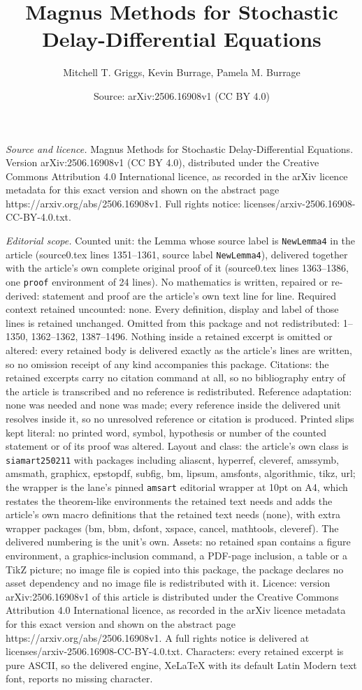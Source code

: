\documentclass[10pt,a4paper]{amsart}
\title[Magnus Methods for Stochastic Delay-Differential Equations]{Magnus Methods for Stochastic Delay-Differential Equations}
\author{Mitchell T. Griggs, Kevin Burrage, Pamela M. Burrage}
\date{Source: arXiv:2506.16908v1 (CC BY 4.0)}
\begin{document}
\maketitle

\noindent\emph{Source and licence.} Magnus Methods for Stochastic Delay-Differential Equations. Version arXiv:2506.16908v1 (CC BY 4.0), distributed under the Creative Commons Attribution 4.0 International licence, as recorded in the arXiv licence metadata for this exact version and shown on the abstract page https://arxiv.org/abs/2506.16908v1. Full rights notice: licenses/arxiv-2506.16908-CC-BY-4.0.txt.\par\smallskip

\noindent\textit{Editorial scope.} Counted unit: the Lemma whose source label is \texttt{NewLemma4} in the article (source0.tex lines 1351--1361, source label \texttt{NewLemma4}), delivered together with the article's own complete original proof of it (source0.tex lines 1363--1386, one \texttt{proof} environment of 24 lines). No mathematics is written, repaired or re-derived: statement and proof are the article's own text line for line. Required context retained uncounted: none. Every definition, display and label of those lines is retained unchanged. Omitted from this package and not redistributed: 1--1350, 1362--1362, 1387--1496. Nothing inside a retained excerpt is omitted or altered: every retained body is delivered exactly as the article's lines are written, so no omission receipt of any kind accompanies this package. Citations: the retained excerpts carry no citation command at all, so no bibliography entry of the article is transcribed and no reference is redistributed. Reference adaptation: none was needed and none was made; every reference inside the delivered unit resolves inside it, so no unresolved reference or citation is produced. Printed slips kept literal: no printed word, symbol, hypothesis or number of the counted statement or of its proof was altered. Layout and class: the article's own class is \texttt{siamart250211} with packages including aliascnt, hyperref, cleveref, amssymb, amsmath, graphicx, epstopdf, subfig, bm, lipsum, amsfonts, algorithmic, tikz, url; the wrapper is the lane's pinned \texttt{amsart} editorial wrapper at 10pt on A4, which restates the theorem-like environments the retained text needs and adds the article's own macro definitions that the retained text needs (none), with extra wrapper packages (bm, bbm, dsfont, xspace, cancel, mathtools, cleveref). The delivered numbering is the unit's own. Assets: no retained span contains a figure environment, a graphics-inclusion command, a PDF-page inclusion, a table or a TikZ picture; no image file is copied into this package, the package declares no asset dependency and no image file is redistributed with it. Licence: version arXiv:2506.16908v1 of this article is distributed under the Creative Commons Attribution 4.0 International licence, as recorded in the arXiv licence metadata for this exact version and shown on the abstract page https://arxiv.org/abs/2506.16908v1. A full rights notice is delivered at licenses/arxiv-2506.16908-CC-BY-4.0.txt. Characters: every retained excerpt is pure ASCII, so the delivered engine, XeLaTeX with its default Latin Modern text font, reports no missing character.
\end{document}
